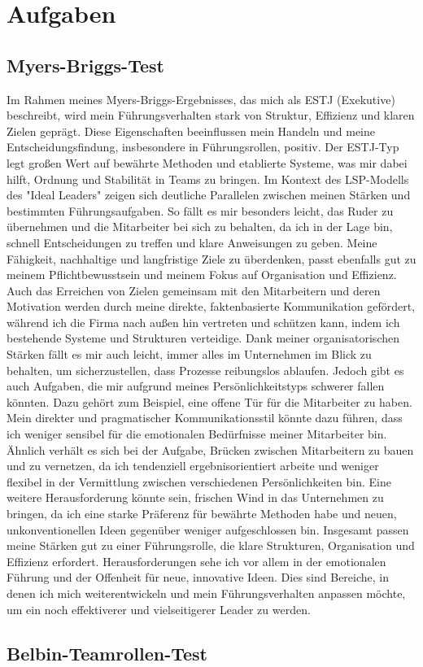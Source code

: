 \section{Aufgaben}
\subsection{Myers-Briggs-Test}

Im Rahmen meines Myers-Briggs-Ergebnisses, das mich als ESTJ (Exekutive) beschreibt, wird mein Führungsverhalten stark von Struktur, Effizienz und klaren Zielen geprägt. Diese Eigenschaften beeinflussen mein Handeln und meine Entscheidungsfindung, insbesondere in Führungsrollen, positiv. Der ESTJ-Typ legt großen Wert auf bewährte Methoden und etablierte Systeme, was mir dabei hilft, Ordnung und Stabilität in Teams zu bringen.
Im Kontext des LSP-Modells des "Ideal Leaders" zeigen sich deutliche Parallelen zwischen meinen Stärken und bestimmten Führungsaufgaben. So fällt es mir besonders leicht, das Ruder zu übernehmen und die Mitarbeiter bei sich zu behalten, da ich in der Lage bin, schnell Entscheidungen zu treffen und klare Anweisungen zu geben. Meine Fähigkeit, nachhaltige und langfristige Ziele zu überdenken, passt ebenfalls gut zu meinem Pflichtbewusstsein und meinem Fokus auf Organisation und Effizienz. Auch das Erreichen von Zielen gemeinsam mit den Mitarbeitern und deren Motivation werden durch meine direkte, faktenbasierte Kommunikation gefördert, während ich die Firma nach außen hin vertreten und schützen kann, indem ich bestehende Systeme und Strukturen verteidige. Dank meiner organisatorischen Stärken fällt es mir auch leicht, immer alles im Unternehmen im Blick zu behalten, um sicherzustellen, dass Prozesse reibungslos ablaufen.
Jedoch gibt es auch Aufgaben, die mir aufgrund meines Persönlichkeitstyps schwerer fallen könnten. Dazu gehört zum Beispiel, eine offene Tür für die Mitarbeiter zu haben. Mein direkter und pragmatischer Kommunikationsstil könnte dazu führen, dass ich weniger sensibel für die emotionalen Bedürfnisse meiner Mitarbeiter bin. Ähnlich verhält es sich bei der Aufgabe, Brücken zwischen Mitarbeitern zu bauen und zu vernetzen, da ich tendenziell ergebnisorientiert arbeite und weniger flexibel in der Vermittlung zwischen verschiedenen Persönlichkeiten bin. Eine weitere Herausforderung könnte sein, frischen Wind in das Unternehmen zu bringen, da ich eine starke Präferenz für bewährte Methoden habe und neuen, unkonventionellen Ideen gegenüber weniger aufgeschlossen bin.
Insgesamt passen meine Stärken gut zu einer Führungsrolle, die klare Strukturen, Organisation und Effizienz erfordert. Herausforderungen sehe ich vor allem in der emotionalen Führung und der Offenheit für neue, innovative Ideen. Dies sind Bereiche, in denen ich mich weiterentwickeln und mein Führungsverhalten anpassen möchte, um ein noch effektiverer und vielseitigerer Leader zu werden.
\newpage

\subsection{Belbin-Teamrollen-Test}
